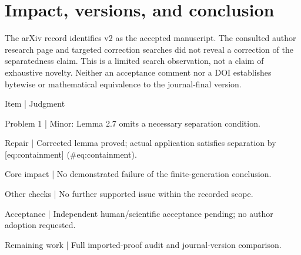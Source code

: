 \documentclass[10pt]{article}
\begin{document}
\section*{Impact, versions, and conclusion}
The arXiv record identifies v2 as the accepted manuscript. The consulted author research page and targeted correction searches did not reveal a correction of the separatedness claim. This is a limited search observation, not a claim of exhaustive novelty. Neither an acceptance comment nor a DOI establishes bytewise or mathematical equivalence to the journal-final version.\par
Item | Judgment\par
Problem 1 | Minor: Lemma 2.7 omits a necessary separation condition.\par
Repair | Corrected lemma proved; actual application satisfies separation by [eq:containment] (\#eq:containment).\par
Core impact | No demonstrated failure of the finite-generation conclusion.\par
Other checks | No further supported issue within the recorded scope.\par
Acceptance | Independent human/scientific acceptance pending; no author adoption requested.\par
Remaining work | Full imported-proof audit and journal-version comparison.\par
\end{document}
